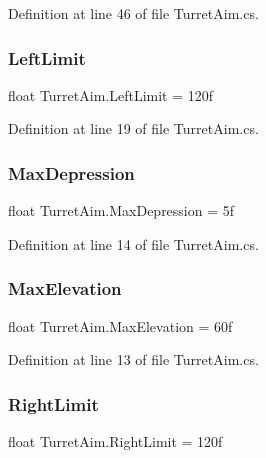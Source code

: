 Definition at line 46 of file Turret\+Aim.\+cs.

\mbox{\label{class_turret_aim_af7cb89dae61664a964d7c4c036b93790}} 
\subsubsection{\texorpdfstring{Left\+Limit}{LeftLimit}}
{\footnotesize\ttfamily float Turret\+Aim.\+Left\+Limit = 120f}



Definition at line 19 of file Turret\+Aim.\+cs.

\mbox{\label{class_turret_aim_abd337edc783d31d7c2eee320d8fa9934}} 
\subsubsection{\texorpdfstring{Max\+Depression}{MaxDepression}}
{\footnotesize\ttfamily float Turret\+Aim.\+Max\+Depression = 5f}



Definition at line 14 of file Turret\+Aim.\+cs.

\mbox{\label{class_turret_aim_abf4a6733d71b76f4c4c8e51fac0d979b}} 
\subsubsection{\texorpdfstring{Max\+Elevation}{MaxElevation}}
{\footnotesize\ttfamily float Turret\+Aim.\+Max\+Elevation = 60f}



Definition at line 13 of file Turret\+Aim.\+cs.

\mbox{\label{class_turret_aim_aa7ad1afe41386cc3b01ec42e150e767d}} 
\subsubsection{\texorpdfstring{Right\+Limit}{RightLimit}}
{\footnotesize\ttfamily float Turret\+Aim.\+Right\+Limit = 120f}



